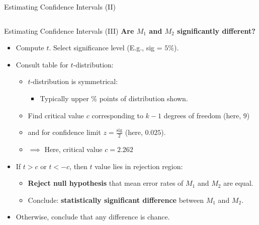\begin{frame}{Estimating Confidence Intervals (II)}
\begin{columns}
\begin{column}{0.35\textwidth}
		\end{column}
	\end{columns}


\end{frame}

\begin{frame}{Estimating Confidence Intervals (III)}
	\textbf{Are $M_1$ and $M_2$ {\color{airforceblue} significantly different}?}
	\begin{itemize}
		\item Compute $t$. Select significance level (E.g., sig = $5 \%$).
		\item Consult table for $t$-distribution:
		      \begin{itemize}
			      \item $t$-distribution is symmetrical:
			            \begin{itemize}
				            \item Typically upper $\%$ points of distribution shown.
			            \end{itemize}
			      \item Find critical value $c$ corresponding to $k-1$ degrees of freedom (here, $9$)
			      \item and for confidence limit $z = \frac{\text{sig}}{2}$ (here, $0.025$).
			      \item $\implies$ Here, critical value $c = 2.262$
		      \end{itemize}
		\item If $t > c$ or $t < -c$, then $t$ value lies in rejection region:
		      \begin{itemize}
			      \item \textbf{Reject null hypothesis} that mean error rates of $M_1$ and $M_2$ are equal.
			      \item Conclude: \textbf{statistically significant difference} between $M_1$ and $M_2$.
		      \end{itemize}
		\item Otherwise, conclude that any difference is chance.
	\end{itemize}
\end{frame}
